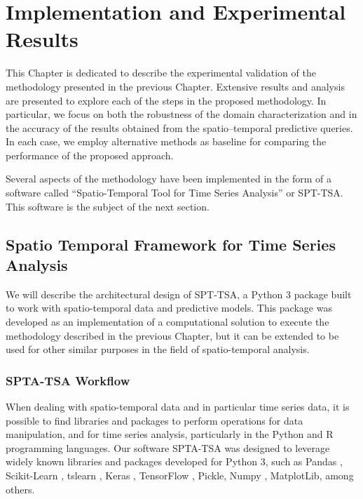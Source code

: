 \chapter{Implementation and Experimental Results}
\label{chapter_Experimental_Results}

This Chapter is dedicated to describe the experimental validation of the methodology presented in the previous Chapter. Extensive results and analysis are presented to explore each of the steps in the proposed methodology. In particular, we focus on both the robustness of the domain characterization and in the accuracy of the results obtained from the spatio--temporal predictive queries. In each case, we employ alternative methods as baseline for comparing the performance of the proposed approach.

Several aspects of the methodology have been implemented in the form of a software called ``Spatio-Temporal Tool for Time Series Analysis'' or SPT-TSA. This software is the subject of the next section.

\section{Spatio Temporal Framework for Time Series Analysis}       
\label{Sec:SPTA-TSA}

We will describe the architectural design of SPT-TSA, a Python 3 package built to work with spatio-temporal data and predictive models. This package was developed as an implementation of a computational solution to execute the methodology described in the previous Chapter, but it can be extended to be used for other similar purposes in the field of spatio-temporal analysis.

\subsection{SPTA-TSA Workflow}
\label{Sec:SPTA-TSA_Workflow}

When dealing with spatio-temporal data and in particular time series data, it is possible to find libraries and packages to perform operations for data manipulation, and for time series analysis, particularly in the Python and R programming languages. Our software SPTA-TSA was designed to leverage widely known libraries and packages developed for Python 3, such as Pandas \cite{McKinney2010}, Scikit-Learn \cite{scikit-learn2011}, tslearn \cite{tslearn2020}, Keras \cite{Chollet2015}, TensorFlow \cite{tensorflow2016}, Pickle, Numpy \cite{Harris2020}, MatplotLib, among others.

